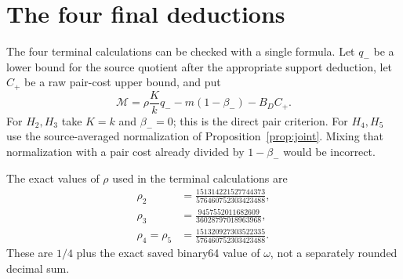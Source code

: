 \documentclass[11pt,a4paper]{article}
\theoremstyle{definition}\newtheorem{definition}[theorem]{Definition}
\theoremstyle{remark}\newtheorem{remark}[theorem]{Remark}
\numberwithin{equation}{section}
\begin{document}
\section{The four final deductions}\label{sec:deductions}
The four terminal calculations can be checked with a single formula. Let $q_-$ be a lower bound for the source quotient after the appropriate support deduction, let $C_+$ be a raw pair-cost upper bound, and put
\begin{equation}\label{eq:terminal}
 \mathcal M=\rho\frac Kk q_- -m(1-\beta_-)-B_D C_+.
\end{equation}
For $H_2,H_3$ take $K=k$ and $\beta_-=0$; this is the direct pair criterion. For $H_4,H_5$ use the source-averaged normalization of Proposition~\ref{prop:joint}. Mixing that normalization with a pair cost already divided by $1-\beta_-$ would be incorrect.

The exact values of $\rho$ used in the terminal calculations are
\begin{align*}
 \rho_2&=\frac{151314221527744373}{576460752303423488},\\
 \rho_3&=\frac{9457552011682609}{36028797018963968},\\
 \rho_4=\rho_5&=\frac{151320927303522335}{576460752303423488}.
\end{align*}
These are $1/4$ plus the exact saved binary64 value of $\omega$, not a separately rounded decimal sum.
\end{document}
